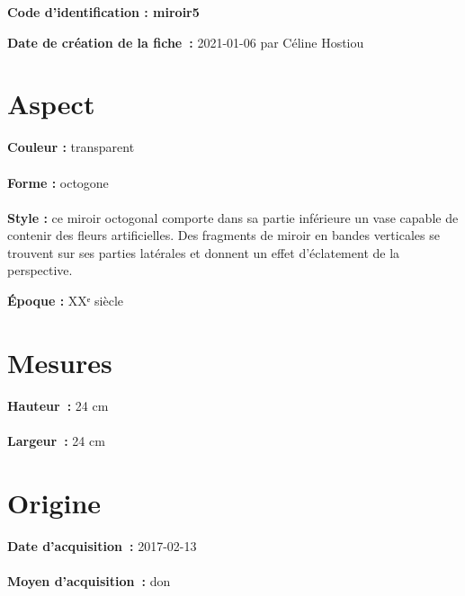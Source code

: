 
     {\bf \huge Code d’identification : miroir5} \\
    \newline \hr \begin{center}   
    \end{center} 
    \begin{itemize}
    
    \footnotesize {\item {\bf Date de création de la fiche :} 2021-01-06
    {par Céline Hostiou}} 
    \end{itemize}
   \hr 
    \section* {Aspect} 
    {\bf \large Couleur :} transparent
    \\ \\ {\bf \large Forme :} octogone 
    \\ \\ {\bf \large Style :} 
            ce miroir octogonal comporte dans sa partie inférieure un vase
            capable de contenir des fleurs artificielles. Des fragments de miroir en bandes
            verticales se trouvent sur ses parties latérales et donnent un effet d’éclatement de la
            perspective.
        
        {\bf \large Époque :} XXᵉ siècle 
    \section* {Mesures}
     {\bf \large Hauteur :} 24 cm
   \\ \\ {\bf \large Largeur :} 24 cm 
  
    \section* {Origine}
    {\bf \large Date d’acquisition :} 2017-02-13 \\ \\
    {\bf \large Moyen d’acquisition :} don \\ \\
      
  
